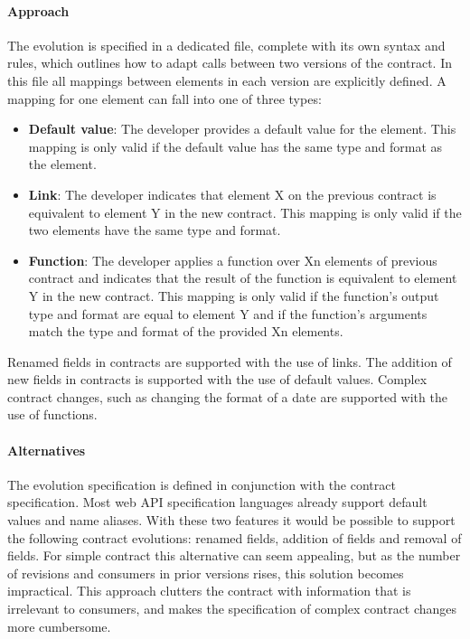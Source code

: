 \paragraph{Approach}
The evolution is specified in a dedicated file, complete with its own syntax and rules,
which outlines how to adapt calls between two versions of the contract.
In this file all mappings between elements in each version are explicitly defined.
A mapping for one element can fall into one of three types:
\begin{itemize}
    \item \textbf{Default value}: The developer provides a default value for the element.
    This mapping is only valid if the default value has the same type and format as the element.
    \item \textbf{Link}: The developer indicates that element X on the previous contract is equivalent to element Y in the new contract.
    This mapping is only valid if the two elements have the same type and format.
    \item \textbf{Function}: The developer applies a function over Xn elements of previous contract and indicates that the result of the function is equivalent to element Y in the new contract.
    This mapping is only valid if the function's output type and format are equal to element Y and if the function's arguments match the type and format of the provided Xn elements.
\end{itemize}
Renamed fields in contracts are supported with the use of links.
The addition of new fields in contracts is supported with the use of default values.
Complex contract changes, such as changing the format of a date are supported with the use of functions.

\paragraph{Alternatives}
The evolution specification is defined in conjunction with the contract specification.
Most web API specification languages already support default values and name aliases.
With these two features it would be possible
to support the following contract evolutions: renamed fields, addition of fields and removal of fields.
For simple contract this alternative can seem appealing, but as the number of revisions and consumers in prior versions rises, this solution becomes impractical.
This approach clutters the contract with information that is irrelevant to consumers, and makes the specification of complex contract changes more cumbersome.

